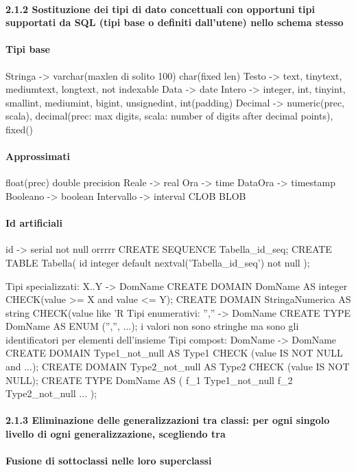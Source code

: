 \documentclass[12pt]{article}
\begin{document}
\paragraph{2.1.2 Sostituzione dei tipi di dato concettuali con opportuni tipi supportati da SQL (tipi base o definiti dall’utene) nello schema stesso}
\paragraph{Tipi base}
				Stringa -> varchar(maxlen di solito 100) char(fixed len)
				Testo -> text, tinytext, mediumtext, longtext, not indexable
				Data -> date
				Intero -> integer, int, tinyint, smallint, mediumint, bigint, unsignedint, int(padding)
				Decimal -> numeric(prec, scala), decimal(prec: max digits, scala: number of digits after decimal points), fixed()
\paragraph{Approssimati}
					float(prec) 
					double precision
					Reale -> real
				Ora -> time
				DataOra -> timestamp
				Booleano -> boolean
				Intervallo -> interval
				CLOB 
				BLOB
\paragraph{Id artificiali}
				id -> serial not null
				orrrrr   
				CREATE SEQUENCE Tabella_id_seq;
				CREATE TABLE Tabella(
					id integer default nextval('Tabella_id_seq') not null
				);


			Tipi specializzati: X..Y -> DomName
				CREATE DOMAIN DomName AS integer
					CHECK(value >= X and value <= Y); 
				CREATE DOMAIN StringaNumerica AS string
					CHECK(value like 'R%
			Tipi enumerativi: {'',''} -> DomName
				CREATE TYPE DomName AS ENUM ('','', ...); i valori non sono stringhe ma sono gli identificatori per elementi dell'insieme
			Tipi compost: DomName -> DomName
				CREATE DOMAIN Type1_not_null AS Type1
					CHECK (value IS NOT NULL and ...);
				CREATE DOMAIN Type2_not_null AS Type2
					CHECK (value IS NOT NULL);
				CREATE TYPE DomName AS (
					f_1 Type1_not_null
					f_2 Type2_not_null
					...	
				);
\paragraph{2.1.3 Eliminazione delle generalizzazioni tra classi: per ogni singolo livello di ogni generalizzazione, scegliendo tra}
\paragraph{Fusione di sottoclassi nelle loro superclassi}
\end{document}
